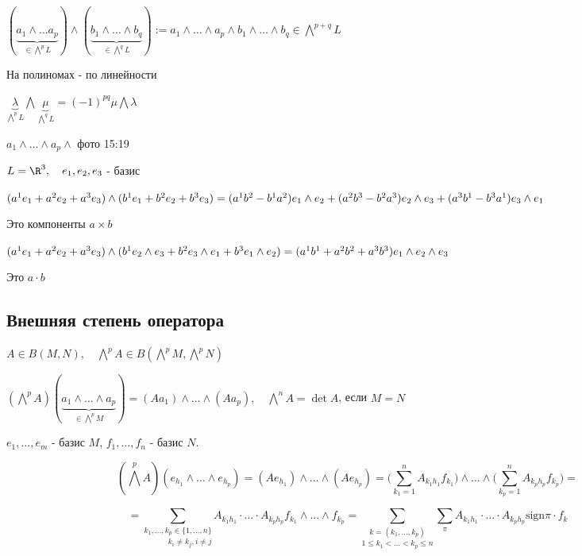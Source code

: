   $(\underbrace{a_1 \land \dotsc a_p}_{\in \bigwedge^pL}) \land (\underbrace{b_1 \land \dotsc \land b_q}_{\in \bigwedge^qL}) := a_1\land\dotsc\land a_p\land b_1\land\dotsc\land b_q \in \bigwedge^{p+q}L$

  На полиномах - по линейности

  $\underbrace{\lambda}_{\bigwedge^pL} \bigwedge \underbrace{\mu}_{\bigwedge^qL} = (-1)^{pq}\mu\bigwedge \lambda$

  $a_1 \land \dotsc \land a_p \land$ фото 15:19

  \begin{illustration}
    $L = \R^3, \quad e_1, e_2, e_3$ - базис
    
    $(a^1e_1 + a^2 e_2 + a^3 e_3) \land (b^1e_1 + b^2e_2 + b^3e_3) =\\ (a^1b^2 - b^1a^2)e_1\land e_2 + (a^2b^3 - b^2a^3)e_2 \land e_3 + (a^3b^1 - b^3a^1)e_3 \land e_1$

    Это компоненты $a\times b$
  \end{illustration}
  \begin{illustration}
    $(a^1e_1 + a^2e_2 + a^3e_3) \land (b^1e_2\land e_3 + b^2e_3\land e_1 + b^3 e_1 \land e_2) = \\ 
    (a^1b^1 + a^2b^2 + a^3b^3)e_1\land e_2 \land e_3$

    Это $a\cdot b$
  \end{illustration}

  \subsection*{Внешняя степень оператора}

  $A \in B(M, N), \quad \bigwedge^p A  \in B(\bigwedge^p M, \bigwedge^p N)$

  $(\bigwedge^p A) (\underbrace{a_1 \land \dotsc \land a_p}_{\in \bigwedge^p M} )= (Aa_1) \land \dotsc\land (Aa_p), \quad \bigwedge^n A = \det A$, если $M=N$

  $e_1, \dotsc, e_m$ - базис $M$, $f_1, \dotsc, f_n$ - базис $N$.

  $$(\bigwedge^p A)(e_{h_1} \land \dotsc \land e_{h_p}) = (Ae_{h_1}) \land \dotsc\land (Ae_{h_p}) = \Big(\sum_{k_1=1}^n A_{k_1h_1} f_{k_1}\Big) \land \dotsc \land \Big(\sum^n_{k_p = 1} A_{k_ph_p} f_{k_p} \Big)=$$

  $$= \underset{k_i\neq k_j, i \neq j}{\sum_{k_1, \dotsc, k_p \in \{1, \dotsc, n\}} A_{k_1h_1}} \cdot \dotsc \cdot A_{k_ph_p} f_{k_1} \land \dotsc \land f_{k_p} = \underset{1 \le k_1 < \dotsc < k_p \le n}{\sum_{k=(k_1, \dotsc, k_p)}} \sum_\pi A_{k_1h_1} \cdot \dotsc\cdot A_{k_ph_p}\text{sign}\pi \cdot f_k$$

